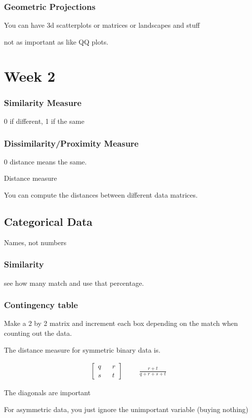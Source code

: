 \documentclass[fleqn]{report}
\newcommand{\hp}{\hspace{1cm}}
\newcommand{\equations} [1] {
\begin{gather*}
#1
\end{gather*}
}
\begin{document}
\subsection{Geometric Projections}
You can have 3d scatterplots or matrices or landscapes and stuff 

not as important as like QQ plots. 

\chapter{Week 2}
\subsection{Similarity Measure}
0 if different, 1 if the same 

\subsection{Dissimilarity/Proximity Measure}
0 distance means the same. 

Distance measure 

You can compute the distances between different data matrices. 

\section{Categorical Data }
Names, not numbers 

\subsection{Similarity}
see how many match and use that percentage.

\subsection{Contingency table}
Make a 2 by 2 matrix and increment each box depending on the match 
when counting out the data.

The distance measure for symmetric binary data is. 

\equations{
    \begin{bmatrix}
        q && r \\
        s && t
    \end{bmatrix}
    \hp 
    \frac{r + t}{q + r + s + t}
}

The diagonals are important 

For asymmetric data, you just ignore the unimportant variable (buying nothing)
\end{document}
